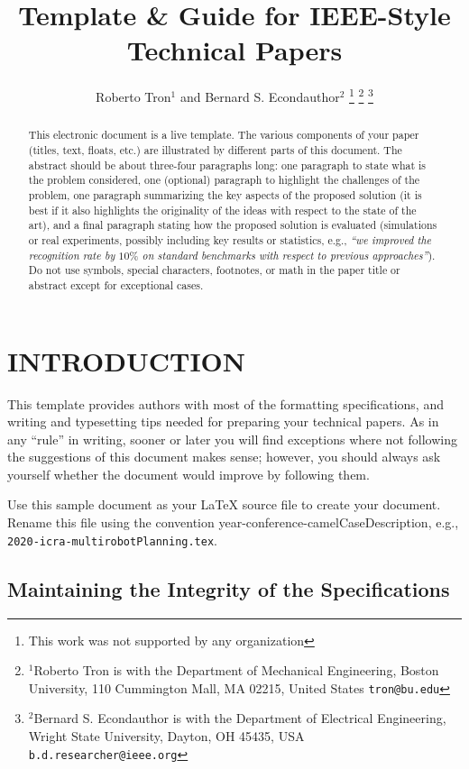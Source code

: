 \documentclass[letterpaper, 10 pt, conference]{ieeeconf}
\title{\LARGE \bf
Template \& Guide for IEEE-Style Technical Papers
}
\author{Roberto Tron$^{1}$ and Bernard S. Econdauthor$^{2}$%
\thanks{This work was not supported by any organization}%
\thanks{$^{1}$Roberto Tron is with the Department of Mechanical Engineering,
        Boston University, 110 Cummington Mall, MA 02215, United States
        {\tt\small tron@bu.edu}}%
\thanks{$^{2}$Bernard S. Econdauthor is with the Department of Electrical Engineering, Wright State University,
        Dayton, OH 45435, USA
        {\tt\small b.d.researcher@ieee.org}}%
}
\begin{document}
\maketitle
\thispagestyle{empty}
\pagestyle{empty}


\begin{abstract}

  This electronic document is a live template. The various components of your paper (titles, text, floats, etc.) are illustrated by different parts of this document.
  The abstract should be about three-four paragraphs long: one paragraph to state what is the problem considered, one (optional) paragraph to highlight the challenges of the problem, one paragraph summarizing the key aspects of the proposed solution (it is best if it also highlights the originality of the ideas with respect to the state of the art), and a final paragraph stating how the proposed solution is evaluated (simulations or real experiments, possibly including key results or statistics, e.g., \emph{``we improved the recognition rate by $10\%$ on standard benchmarks with respect to previous approaches''}).
  Do not use symbols, special characters, footnotes, or math in the paper title or abstract except for exceptional cases.
\end{abstract}


\section{INTRODUCTION}

This template provides authors with most of the formatting specifications, and writing and typesetting tips needed for preparing your technical papers.
As in any ``rule'' in writing, sooner or later you will find exceptions where not following the suggestions of this document makes sense; however, you should always ask yourself whether the document would improve by following them.

Use this sample document as your LaTeX source file to create your document. Rename this file using the convention year-conference-camelCaseDescription, e.g., \texttt{2020-icra-multirobotPlanning.tex}.

\subsection{Maintaining the Integrity of the Specifications}
\end{document}
